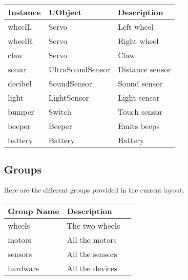 \begin{center}
  \begin{tabular}{|l|l|l|}
    \hline
    Instance & UObject          & Description    \\
    \hline
    wheelL   & Servo            & Left wheel     \\
    wheelR   & Servo            & Right wheel    \\
    claw     & Servo            & Claw           \\
    sonar    & UltraSoundSensor & Distance sensor\\
    decibel  & SoundSensor      & Sound sensor   \\
    light    & LightSensor      & Light sensor   \\
    bumper   & Switch           & Touch sensor   \\
    beeper   & Beeper           & Emits beeps    \\
    battery  & Battery          & Battery        \\
    \hline
  \end{tabular}
\end{center}

\subsection{Groups}
Here are the different groups provided in the current layout.

\begin{center}
  \begin{tabular}{|l|l|l|}
    \hline
    Group Name & Description     \\
    \hline
    wheels     & The two wheels  \\
    motors     & All the motors  \\
    sensors    & All the sensors \\
    hardware   & All the devices \\
    \hline
  \end{tabular}
\end{center}

